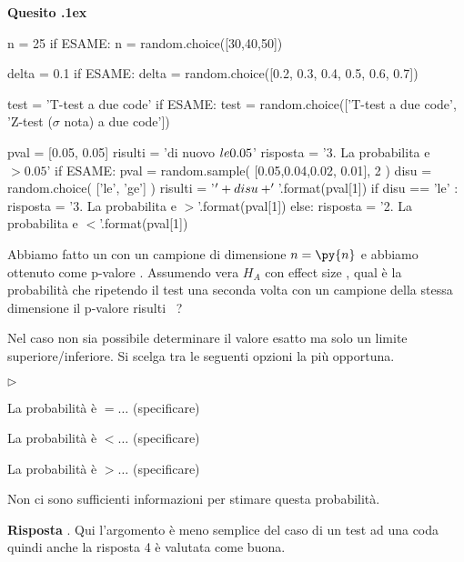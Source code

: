\documentclass[11pt,twoside,a4paper]{article}
\newcommand{\mylabel}[1]{#1\hfill}
\renewenvironment{itemize}
  {\begin{list}{$\triangleright$}{%
   \setlength{\parskip}{0mm}
   \setlength{\topsep}{.4\baselineskip}
   \setlength{\rightmargin}{0mm}
   \setlength{\listparindent}{0mm}
   \setlength{\itemindent}{0mm}
   \setlength{\labelwidth}{2ex}
   \setlength{\itemsep}{.4\baselineskip}
   \setlength{\parsep}{0mm}
   \setlength{\partopsep}{0mm}
   \setlength{\labelsep}{1ex}
   \setlength{\leftmargin}{\labelwidth+\labelsep}
   \let\makelabel\mylabel}}{%
   \end{list}\vspace*{-1.3mm}}
\newcounter{quesito}
\newenvironment{xquestion}{\bigskip\addtocounter{quesito}{1}\par\textbf{Quesito \thequesito.\kern1ex}}{\vspace{\parskip}}
\newenvironment{answer}{\par\textbf{Risposta\quad}}{\vspace{\parskip}}
\begin{document}
\begin{xquestion} %
\begin{pycode}
n = 25
if ESAME: n = random.choice([30,40,50])

delta = 0.1
if ESAME: delta = random.choice([0.2, 0.3, 0.4, 0.5, 0.6, 0.7])

test = 'T-test a due code'
if ESAME: test = random.choice(['T-test a due code', 'Z-test ($\sigma$ nota) a due code'])

pval = [0.05, 0.05]
risulti = 'di nuovo $\\le 0.05$'
risposta = '3. La probabilita e $>0.05$'
if ESAME: 
   pval = random.sample( [0.05,0.04,0.02, 0.01], 2 )
   disu = random.choice( ['le', 'ge'] ) 
   risulti = '$\\' + disu + '{}$'.format(pval[1])
   if disu == 'le' :
      risposta = '3. La probabilita e $>{}$'.format(pval[1])
   else:
      risposta = '2. La probabilita e $<{}$'.format(pval[1])
\end{pycode}
Abbiamo fatto un  con un campione di dimensione $n=\py{n}$ e abbiamo ottenuto come p-valore .
Assumendo vera $H_A$ con effect size , qual è la probabilità che ripetendo il test una seconda volta con un campione della stessa dimensione il p-valore risulti ~?

Nel caso non sia possibile determinare il valore esatto ma solo un limite superiore/inferiore. Si scelga tra le seguenti opzioni la più opportuna.
\begin{itemize}
\item[1.] La probabilità è $=\dots$ (specificare)
\item[2.] La probabilità è $<\dots$ (specificare)
\item[3.] La probabilità è $>\dots$ (specificare)
\item[4.] Non ci sono sufficienti informazioni per stimare questa probabilità.
\end{itemize}
\begin{answer}
{\color{blue}.} Qui l'argomento è meno semplice del caso di un test ad una coda quindi anche la risposta 4 è valutata come buona.
\end{answer}
\end{xquestion}
\end{document}
